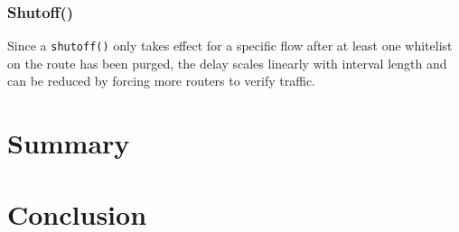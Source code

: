 \documentclass{acm_proc_article-sp}
\begin{document}
\subsubsection{Shutoff()}
Since a \texttt{shutoff()} only takes effect for a specific flow after at least one whitelist on the route has been purged, the delay scales linearly with interval length and can be reduced by forcing more routers to verify traffic.

\section{Summary}

\section{Conclusion}

%

%
%
\balancecolumns
\end{document}
